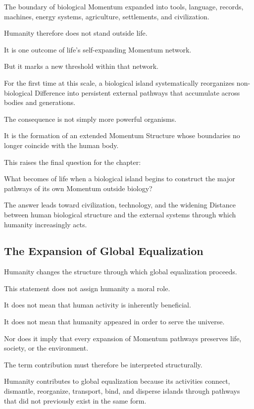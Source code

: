 The boundary of biological Momentum expanded into tools, language, records, machines, energy systems, agriculture, settlements, and civilization.

Humanity therefore does not stand outside life.

It is one outcome of life’s self-expanding Momentum network.

But it marks a new threshold within that network.

For the first time at this scale, a biological island systematically reorganizes non-biological Difference into persistent external pathways that accumulate across bodies and generations.

The consequence is not simply more powerful organisms.

It is the formation of an extended Momentum Structure whose boundaries no longer coincide with the human body.

This raises the final question for the chapter:

What becomes of life when a biological island begins to construct the major pathways of its own Momentum outside biology?

The answer leads toward civilization, technology, and the widening Distance between human biological structure and the external systems through which humanity increasingly acts.

\subsection*{\textbf{The Expansion of Global Equalization}} 

Humanity changes the structure through which global equalization proceeds.

This statement does not assign humanity a moral role.

It does not mean that human activity is inherently beneficial.

It does not mean that humanity appeared in order to serve the universe.

Nor does it imply that every expansion of Momentum pathways preserves life, society, or the environment.

The term contribution must therefore be interpreted structurally.

Humanity contributes to global equalization because its activities connect, dismantle, reorganize, transport, bind, and disperse islands through pathways that did not previously exist in the same form.

